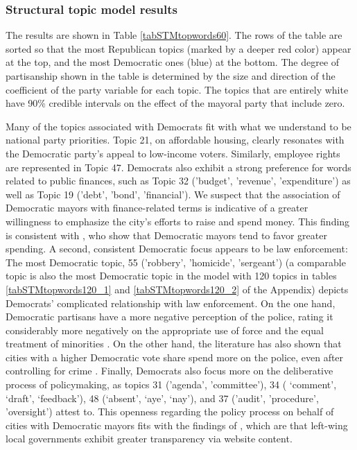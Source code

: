 \documentclass[11pt]{article}
\begin{document}
\subsubsection{Structural topic model results}


The results are shown in Table \ref{tabSTMtopwords60}. The rows of the table are sorted so that the most Republican topics (marked by a deeper red color) appear at the top, and the most Democratic ones (blue) at the bottom. The degree of partisanship shown in the table is determined by the size and direction of the coefficient of the party variable for each topic. The topics that are entirely white have 90\% credible intervals on the effect of the mayoral party that include zero.

Many of the topics associated with Democrats fit with what we understand to be national party priorities. Topic 21, on affordable housing, clearly resonates with the Democratic party's appeal to low-income voters. Similarly, employee rights are represented in Topic 47. Democrats also exhibit a strong preference for words related to public finances, such as Topic 32 ('budget', 'revenue', 'expenditure') as well as Topic 19 ('debt', 'bond', 'financial'). We suspect that the association of Democratic mayors with finance-related terms is indicative of a greater willingness to emphasize the city's efforts to raise and spend money. This finding is consistent with \citep{Einstein2015}, who show that Democratic mayors tend to favor greater spending. A second, consistent Democratic focus appears to be law enforcement: The most Democratic topic, 55 ('robbery', 'homicide', 'sergeant') (a comparable topic is also the most Democratic topic in the model with 120 topics in tables \ref{tabSTMtopwords120_1} and \ref{tabSTMtopwords120_2} of the Appendix) depicts Democrats' complicated relationship with law enforcement. On the one hand, Democratic partisans have a more negative perception of the police, rating it considerably more negatively on the appropriate use of force and the equal treatment of minorities \citep{Brown2017}. On the other hand, the literature has also shown that cities with a higher Democratic vote share spend more on the police, even after controlling for crime \citep{Einstein2015}. Finally, Democrats also focus more on the deliberative process of policymaking, as topics 31 ('agenda', 'committee'), 34 ( `comment', `draft', `feedback'), 48 (`absent', `aye', `nay'), and 37 ('audit', 'procedure', 'oversight') attest to.  This openness regarding the policy process on behalf of cities with Democratic mayors fits with the findings of \citet{grimmelikhuijsen2012developing}, which are that left-wing local governments exhibit greater transparency via website content.
\end{document}
